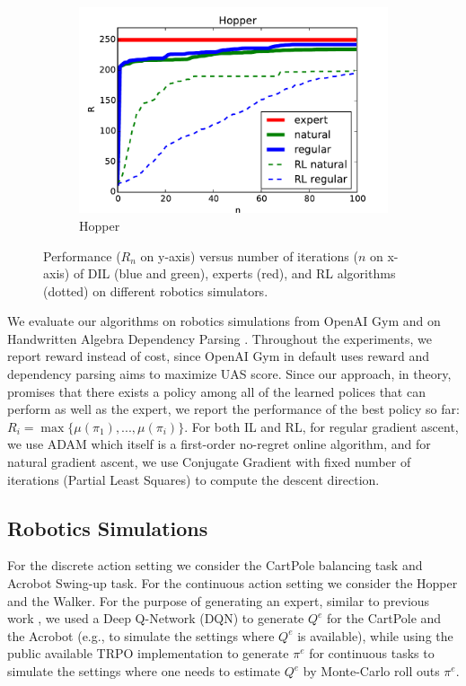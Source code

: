 \documentclass{article}
\begin{document}
\begin{figure}[t!]
\begin{subfigure}[l]{0.1962\textwidth}
        \includegraphics[width=1.12\textwidth,keepaspectratio]{./figure/Hopper_comparison.pdf}
        \caption{Hopper}
        \label{fig:hopper}
    \end{subfigure}
    \caption{Performance ($R_n$ on y-axis) versus number of iterations ($n$ on x-axis) of DIL (blue and green), experts (red), and RL algorithms (dotted) on different robotics simulators. }
    \label{fig:perf_robotics}
\end{figure}
We evaluate our algorithms on robotics simulations from OpenAI Gym \cite{brockman2016openai} and on Handwritten Algebra Dependency Parsing \cite{duyckpredicting}. Throughout the experiments, we report reward instead of cost, since OpenAI Gym in default uses reward and dependency parsing aims to maximize UAS score.  Since our approach, in theory, promises that there exists a policy among all of the learned polices that can perform as well as the expert, we report the performance of the best policy so far: $R_i = \max\{\mu(\pi_1), ..., \mu(\pi_i)\}$. For both IL and RL, for regular gradient ascent, we use ADAM \cite{kingma2014adam} which itself is a first-order no-regret online algorithm, and for natural gradient ascent, we use Conjugate Gradient with fixed number of iterations (Partial Least Squares) to compute the descent direction. 


\subsection{Robotics Simulations}
For the discrete action setting we consider the CartPole balancing task and Acrobot Swing-up task. For the continuous action setting we consider the Hopper and the Walker. For the purpose of generating an expert, similar to previous work \cite{ho2016generative}, we used a Deep Q-Network (DQN) to generate $Q^e$ for the CartPole and the Acrobot (e.g., to simulate the settings where $Q^e$ is available), while using the public available TRPO implementation to generate $\pi^e$ for continuous tasks to simulate the settings where one needs to estimate $Q^e$ by Monte-Carlo roll outs $\pi^e$. %
\end{document}
